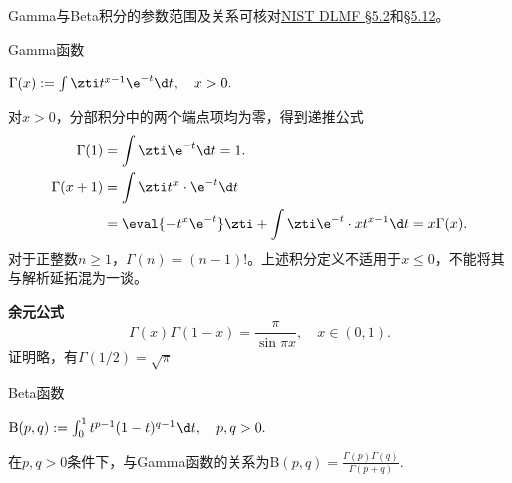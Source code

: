 Gamma与Beta积分的参数范围及关系可核对\href{https://dlmf.nist.gov/5.2}{NIST DLMF §5.2}和\href{https://dlmf.nist.gov/5.12}{§5.12}。
\begin{example}{Gamma函数}{}
	\begin{center}
		$\Gamma(x):=\int\zti t^{x-1}\e^{-t}\d t,\quad x>0.$
	\end{center}
	对$x>0$，分部积分中的两个端点项均为零，得到递推公式
	\begin{align*}
		\Gamma(1)   & =\int\zti\e^{-t}\d t=1.                                              \\
		\Gamma(x+1) & =\int\zti t^x\cdot\e^{-t}\d t                                        \\
					& =\eval{-t^x\e^{-t}}\zti+\int\zti\e^{-t}\cdot xt^{x-1}\d t=x\Gamma(x).
	\end{align*}
	对于正整数$n\geq1$，$\Gamma(n)=(n-1)!$。上述积分定义不适用于$x\leq0$，不能将其与解析延拓混为一谈。

	\textbf{余元公式}
	\[
		\Gamma(x)\Gamma(1-x)=\frac{\pi}{\sin\pi x},\quad x\in(0,1).
	\]
	证明略，有$\Gamma(1/2)=\sqrt\pi$
\end{example}
\begin{example}{Beta函数}{}
	\begin{center}
		$\mathrm B(p,q):=\int_0^1t^{p-1}(1-t)^{q-1}\d t,\quad p,q>0.$ %
	\end{center}
	在$p,q>0$条件下，与Gamma函数的关系为$\mathrm B(p,q)=\frac{\Gamma(p)\Gamma(q)}{\Gamma(p+q)}.$
\end{example}
